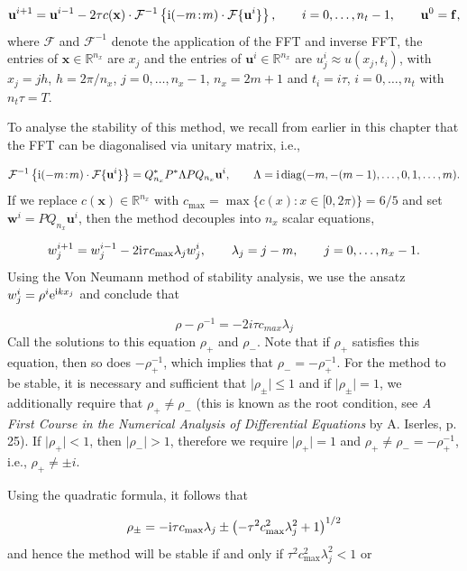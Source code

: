 \documentclass[12pt,a4paper]{article}
\begin{document}
\[
\mathbf{u}^{i+1} = \mathbf{u}^{i-1} - 2\tau c(\mathbf{x})\cdot \mathcal{F}^{-1}\left\lbrace {\rm i}(-m\!:\!m)\cdot\mathcal{F}\lbrace \mathbf{u}^{i} \rbrace\right\rbrace, \qquad i = 0, \ldots, n_t-1, \qquad \mathbf{u}^0 = \mathbf{f},
\]
where $\mathcal{F}$ and $\mathcal{F}^{-1}$ denote the application of the FFT and inverse FFT, the entries of $\mathbf{x} \in \mathbb{R}^{n_x}$ are $x_j$ and the entries of $\mathbf{u}^{i} \in \mathbb{R}^{n_x}$ are $u^{i}_j \approx u(x_j, t_i)$, with $x_j = jh$, $h = 2\pi/n_x$, $j = 0, \ldots, n_x -1$, $n_x = 2m + 1$ and $t_i = i\tau$, $i = 0, \ldots, n_t$ with $n_t\tau = T$.

To analyse the stability of this method, we recall from earlier in this chapter that the FFT can be diagonalised via unitary matrix, i.e., 

\[
\mathcal{F}^{-1}\left\lbrace {\rm i}(-m\!:\!m)\cdot\mathcal{F}\lbrace \mathbf{u}^{i} \rbrace\right\rbrace = 
Q_{n_x}^*P^*\Lambda PQ_{n_x} \mathbf{u}^{i}, \qquad \Lambda = {\rm i}\,\mathrm{diag}(-m, -(m-1), \ldots, 0, 1, \ldots, m).
\]
If we replace $c(\mathbf{x}) \in \mathbb{R}^{n_x}$ with $c_{\max} = \max\lbrace c(x) : x \in [0, 2\pi)\rbrace = 6/5$ and set $\mathbf{w}^{i} = PQ_{n_x}\mathbf{u}^{i}$, then the method decouples into $n_x$ scalar equations,

\[
w^{i+1}_j = w^{i-1}_j - 2{\rm i}\tau c_{\max} \lambda_j w^i_j, \qquad \lambda_j = j-m, \qquad j = 0, \ldots, n_x-1.
\]
Using the Von Neumann method of stability analysis, we use the ansatz $w_j^i = \rho^i {\rm e}^{{\rm i}kx_j}$ and conclude that

\[
\rho - \rho^{-1} = -2i\tau c_{max}\lambda_j
\]
Call the solutions to this equation $\rho_+$ and $\rho_-$. Note that if $\rho_+$ satisfies this equation, then so does $-\rho^{-1}_+$, which implies that $\rho_- = -\rho_+^{-1}$. For the method to be stable, it is necessary and sufficient that $\vert \rho_{\pm} \vert \leq 1$ and if $\vert \rho_{\pm} \vert = 1$, we additionally require that $\rho_{+} \neq \rho_{-}$ (this is known as the root condition, see \emph{A First Course in the Numerical Analysis of Differential Equations} by A. Iserles, p. 25).  If $\vert \rho_+ \vert < 1$, then $\vert \rho_- \vert > 1$, therefore we require $\vert \rho_+ \vert = 1$ and $\rho_+ \neq \rho_- = -\rho_+^{-1}$, i.e., $\rho_+ \neq \pm i$.

Using the quadratic formula, it follows that

\[
\rho_{\pm} = -{\rm i}\tau c_{\max} \lambda_j \pm \left(-\tau^2 c^2_{\max}\lambda_j^2 + 1   \right)^{1/2}
\]
and hence the method will be stable if and only if $\tau^2 c_{\max}^2 \lambda^2_j < 1$ or 
\end{document}

